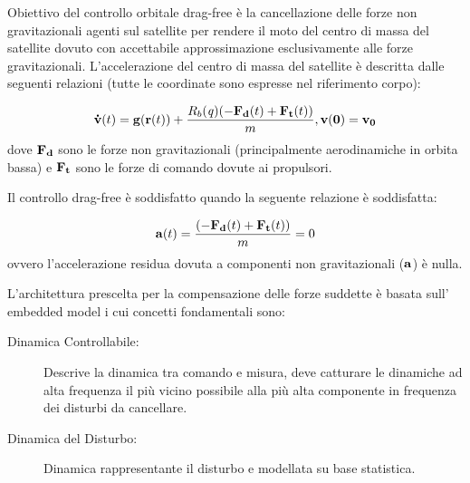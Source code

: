 Obiettivo del controllo orbitale drag-free è la cancellazione delle forze non
gravitazionali agenti sul satellite per rendere il moto del centro di massa del
satellite dovuto con accettabile approssimazione esclusivamente alle forze
gravitazionali. L'accelerazione del centro di massa del satellite è descritta
dalle seguenti relazioni (tutte le coordinate sono espresse nel riferimento
corpo):

\begin{equation}
\mathbf{\dot{v}}(t) = \mathbf{g}(\mathbf{r}(t))+
\frac{R_b(\mathit{q})(-\mathbf{F_d}(t)+\mathbf{F_t}(t))}{m},
\mathbf{v(0)=v_	0}
\end{equation}
dove $\mathbf{F_d}$ sono le forze non gravitazionali (principalmente
aerodinamiche in orbita bassa) e $\mathbf{F_t}$ sono le forze di comando
dovute ai propulsori.

Il controllo drag-free è soddisfatto quando la seguente relazione è soddisfatta:

\begin{equation}
\mathbf{a}(t) = \frac{(- \mathbf{F_d}(t) + \mathbf{F_t}(t))}{m}=0
\end{equation}
ovvero l'accelerazione residua dovuta a componenti non gravitazionali
($\mathbf{a}$) è nulla.

L'architettura prescelta per la compensazione delle forze suddette è basata 
sull' embedded model i cui concetti fondamentali sono:
\begin{description}
\item[Dinamica Controllabile:] Descrive la dinamica tra comando e misura, deve
catturare le dinamiche ad alta frequenza il più vicino possibile alla più alta
componente in frequenza dei disturbi da cancellare.
\item[Dinamica del Disturbo:] Dinamica rappresentante il disturbo e modellata su
base statistica.
\end{description} 

